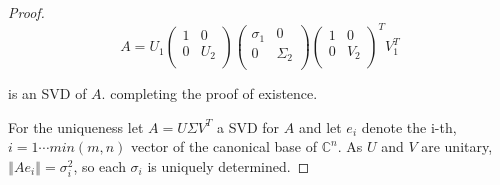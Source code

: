 \documentclass[12pt]{article}
\newcommand{\norm}[1]{\left\Vert#1\right\Vert}
\newcommand{\C}{\mathbb C}
\begin{document}
\begin{proof}
$$A=U_1 \left( \begin{array}{cc} 1 & 0 \\ 0 & U_2 \\ \end{array} \right)
\left( \begin{array}{cc} \sigma_1 & 0 \\ 0 & \Sigma_2 \\
\end{array} \right) \left( \begin{array}{cc} 1 & 0 \\ 0 & V_2 \\ \end{array}
\right)^T V_1^T$$

\noindent is an SVD of $A$. completing the proof of existence.

For the uniqueness let $A=U \Sigma V^T$ a SVD for $A$ and let $e_i$
denote the i-th, $i=1 \cdots min(m,n)$ vector of the canonical base of $\C^n$. As $U$ and
$V$ are unitary, $\norm{Ae_i}=\sigma_i^2$, so each
$\sigma_i$ is uniquely determined.



\end{proof}
\end{document}
